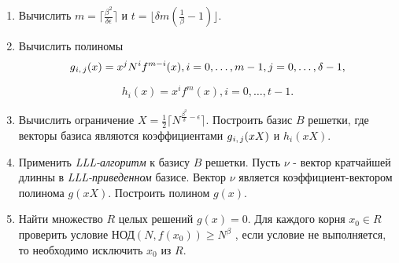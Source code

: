     \begin{enumerate}
      \item Вычислить {$m = \lceil \frac{\beta^2}{\delta \epsilon} \rceil$} и {$t = \lfloor \delta m (\frac{1}{\beta} - 1) \rfloor$}.
      \item Вычислить полиномы
	\begin{equation}
	   g\textsubscript{{$i,j$}}(x) = x^j N^i f^{m-i}(x), i=0, \dots, m-1, j=0, \dots, \delta-1,
	\end{equation}
	
	\begin{equation}
	   h_i(x) = x^i f^m(x), i = 0, \dots, t-1.
	\end{equation}
	
      \item Вычислить ограничение {$X = \frac{1}{2} \lceil N^{\frac{\beta^2}{\delta} - \epsilon} \rceil$}. Построить базис {$B$} решетки,
	где векторы базиса являются коэффициентами {$g\textsubscript{{$i,j$}}(x X)$} и {$h_i(x X)$}.
      \item Применить \textit{LLL-алгоритм} к базису {$B$} решетки. Пусть {$\nu$} - вектор кратчайшей длинны в \textit{LLL-приведенном} базисе. Вектор {$\nu$} является коэффициент-вектором полинома {$g(xX)$}. Построить полином {$g(x)$}.
      \item Найти множество {$R$} целых решений {$g(x) = 0$}. Для каждого корня {$x_0 \in R$} проверить условие НОД{$(N, f(x_0)) \ge N^\beta$}
      , если условие не выполняется, то необходимо исключить {$x_0$} из {$R$}.
    \end{enumerate}    
